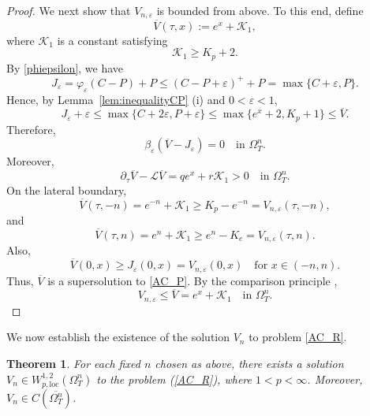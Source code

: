 \documentclass[11pt, a4paper, leqno]{amsart}
\numberwithin{equation}{section}
\theoremstyle{plain}
\newtheorem{theorem}{Theorem}[section]
\theoremstyle{definition}
\theoremstyle{remark}
\def\leq{\leqslant}
\def\geq{\geqslant}
\begin{document}
\begin{proof}
We next show that $V_{n,\varepsilon}$ is bounded from above.
{
To this end, define
\[
    \overline{V}(\tau,x):=e^x+\mathcal{K}_1,
\]
where $\mathcal{K}_1$ is a constant satisfying
\[
    \mathcal{K}_1\geq K_p+2.
\]
By \eqref{phiepsilon}, we have
\[
    J_\varepsilon
    =\varphi_\varepsilon(C-P)+P
    \leq (C-P+\varepsilon)^++P
    =\max\{C+\varepsilon,P\}.
\]
Hence, by Lemma~\ref{lem:inequalityCP} (i) and
$0<\varepsilon<1$,
\[
    J_\varepsilon+\varepsilon
    \leq
    \max\{C+2\varepsilon,P+\varepsilon\}
    \leq
    \max\{e^x+2,K_p+1\}
    \leq
    \overline V.
\]
Therefore,
\[
    \beta_\varepsilon(\overline V-J_\varepsilon)=0
    \quad\text{in }\Omega_T^n.
\]
Moreover,
\[
    \partial_\tau\overline V-\mathcal L\overline V
    =qe^x+r\mathcal K_1>0
    \quad\text{in }\Omega_T^n.
\]
On the lateral boundary,
\[
    \overline V(\tau,-n)
    =e^{-n}+\mathcal K_1
    \geq K_p-e^{-n}
    =V_{n,\varepsilon}(\tau,-n),
\]
and
\[
    \overline V(\tau,n)
    =e^n+\mathcal K_1
    \geq e^n-K_c
    =V_{n,\varepsilon}(\tau,n).
\]
Also,
\[
    \overline V(0,x)
    \geq J_\varepsilon(0,x)
    =V_{n,\varepsilon}(0,x)
    \quad\text{for }x\in(-n,n).
\]
}
Thus, $\overline V$ is a supersolution to \eqref{AC_P}.
By the comparison principle {\cite[Theorem 1.1]{YY08}},
\[
    V_{n,\varepsilon}\leq\overline V
    {= e^x+\mathcal K_1}
    \quad\text{in }\Omega_T^n.
\]
\end{proof}

We now establish the existence of the solution $V_n$ to problem \eqref{AC_R}. 

\begin{theorem} \label{VN}
   {
   For each fixed $n$ chosen as above,
   there exists a solution
   $V_n\in W^{1,2}_{p,\mathrm{loc}}(\Omega^{n}_T)$
   to the problem (\ref{AC_R}), where $1<p<\infty$.
   }
   Moreover, $V_n\in C(\overline{\Omega^{n}_T})$.
\end{theorem}
\end{document}
